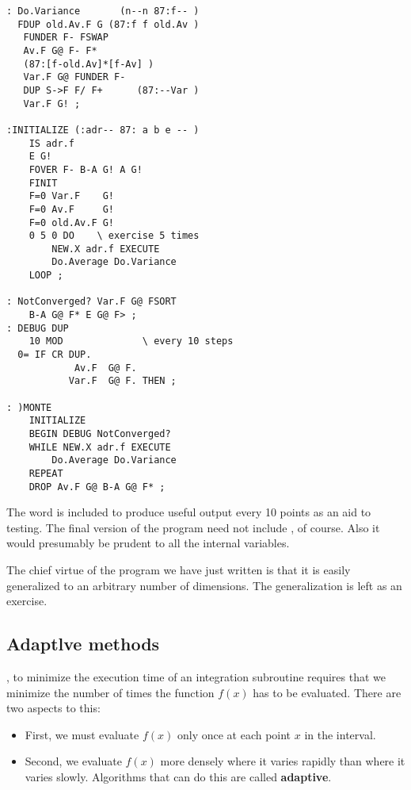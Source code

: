 \begin{multicols}{2}
    \begin{lstlisting}[basicstyle=\scriptsize,]
: Do.Variance       (n--n 87:f-- )
  FDUP old.Av.F G (87:f f old.Av )
   FUNDER F- FSWAP
   Av.F G@ F- F*
   (87:[f-old.Av]*[f-Av] )
   Var.F G@ FUNDER F-
   DUP S->F F/ F+      (87:--Var )
   Var.F G! ;

:INITIALIZE (:adr-- 87: a b e -- )
    IS adr.f
    E G!
    FOVER F- B-A G! A G!
    FINIT
    F=0 Var.F    G!
    F=0 Av.F     G!
    F=0 old.Av.F G!
    0 5 0 DO    \ exercise 5 times
        NEW.X adr.f EXECUTE
        Do.Average Do.Variance
    LOOP ;

: NotConverged? Var.F G@ FSORT
    B-A G@ F* E G@ F> ;
: DEBUG DUP
    10 MOD              \ every 10 steps
  0= IF CR DUP.
            Av.F  G@ F.
           Var.F  G@ F. THEN ;

: )MONTE
    INITIALIZE
    BEGIN DEBUG NotConverged?
    WHILE NEW.X adr.f EXECUTE
        Do.Average Do.Variance
    REPEAT
    DROP Av.F G@ B-A G@ F* ;
  \end{lstlisting}
\end{multicols}

The word  is included to produce useful output every 10 points as an aid to testing. The final version of the program need not include , of course. Also it would presumably be prudent to  all the internal variables.

The chief virtue of the program we have just written is that it is easily generalized to an arbitrary number of dimensions. The generalization is left as an exercise.

\subsection{Adaptlve methods}
, to minimize the execution time of an integration subroutine requires that we minimize the number of times the function $f(x)$ has to be evaluated. There are two aspects to this:

\begin{itemize}
    \item First, we must evaluate $f(x)$ only once at each point $x$ in the interval.
    \item Second, we evaluate $f(x)$ more densely where it varies rapidly than where it varies slowly. Algorithms that can do this are called \textbf{adaptive}.
\end{itemize}

